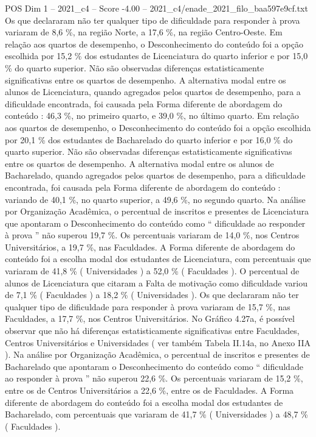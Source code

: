 \begin{textsample}{POS Dim 1 – 2021\_c4 – Score -4.00 – 2021\_c4/enade\_2021\_filo\_baa597e9cf.txt}
Os que declararam não ter qualquer tipo de dificuldade para responder à prova variaram de 8,6 \%, na região Norte, a 17,6 \%, na região Centro-Oeste.
Em relação aos quartos de desempenho, o Desconhecimento do conteúdo foi a opção escolhida por 15,2 \% dos estudantes de Licenciatura do quarto inferior e por 15,0 \% do quarto superior.
Não são observadas diferenças estatisticamente significativas entre os quartos de desempenho.
A alternativa modal entre os alunos de Licenciatura, quando agregados pelos quartos de desempenho, para a dificuldade encontrada, foi causada pela Forma diferente de abordagem do conteúdo : 46,3 \%, no primeiro quarto, e 39,0 \%, no último quarto.
Em relação aos quartos de desempenho, o Desconhecimento do conteúdo foi a opção escolhida por 20,1 \% dos estudantes de Bacharelado do quarto inferior e por 16,0 \% do quarto superior.
Não são observadas diferenças estatisticamente significativas entre os quartos de desempenho.
A alternativa modal entre os alunos de Bacharelado, quando agregados pelos quartos de desempenho, para a dificuldade encontrada, foi causada pela Forma diferente de abordagem do conteúdo : variando de 40,1 \%, no quarto superior, a 49,6 \%, no segundo quarto.
Na análise por Organização Acadêmica, o percentual de inscritos e presentes de Licenciatura que apontaram o Desconhecimento do conteúdo como “ dificuldade ao responder à prova ” não superou 19,7 \%.
Os percentuais variaram de 14,0 \%, nos Centros Universitários, a 19,7 \%, nas Faculdades.
A Forma diferente de abordagem do conteúdo foi a escolha modal dos estudantes de Licenciatura, com percentuais que variaram de 41,8 \% ( Universidades ) a 52,0 \% ( Faculdades ).
O percentual de alunos de Licenciatura que citaram a Falta de motivação como dificuldade variou de 7,1 \% ( Faculdades ) a 18,2 \% ( Universidades ).
Os que declararam não ter qualquer tipo de dificuldade para responder à prova variaram de 15,7 \%, nas Faculdades, a 17,7 \%, nos Centros Universitários.
No Gráfico 4.27a, é possível observar que não há diferenças estatisticamente significativas entre Faculdades, Centros Universitários e Universidades ( ver também Tabela II.14a, no Anexo IIA ).
Na análise por Organização Acadêmica, o percentual de inscritos e presentes de Bacharelado que apontaram o Desconhecimento do conteúdo como “ dificuldade ao responder à prova ” não superou 22,6 \%.
Os percentuais variaram de 15,2 \%, entre os de Centros Universitários a 22,6 \%, entre os de Faculdades.
A Forma diferente de abordagem do conteúdo foi a escolha modal dos estudantes de Bacharelado, com percentuais que variaram de 41,7 \% ( Universidades ) a 48,7 \% ( Faculdades ).

\end{textsample}
